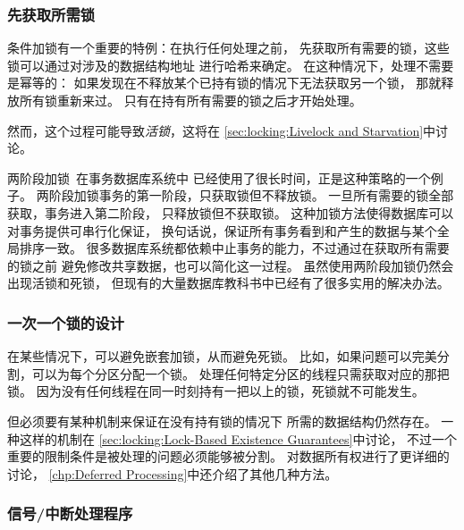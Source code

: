 \subsubsection{先获取所需锁}
\label{sec:locking:Acquire Needed Locks First}

条件加锁有一个重要的特例：在执行任何处理之前，
先获取所有需要的锁，这些锁可以通过对涉及的数据结构地址
进行哈希来确定。
在这种情况下，处理不需要是幂等的：
如果发现在不释放某个已持有锁的情况下无法获取另一个锁，
那就释放所有锁重新来过。
只有在持有所有需要的锁之后才开始处理。

然而，这个过程可能导致\emph{活锁}，这将在
\cref{sec:locking:Livelock and Starvation}中讨论。

\QuickQuizEnd

两阶段加锁~\cite{PhilipABernstein1987}在事务数据库系统中
已经使用了很长时间，正是这种策略的一个例子。
两阶段加锁事务的第一阶段，只获取锁但不释放锁。
一旦所有需要的锁全部获取，事务进入第二阶段，
只释放锁但不获取锁。
这种加锁方法使得数据库可以对事务提供可串行化保证，
换句话说，保证所有事务看到和产生的数据与某个全局排序一致。
很多数据库系统都依赖中止事务的能力，不过通过在获取所有需要的锁之前
避免修改共享数据，也可以简化这一过程。
虽然使用两阶段加锁仍然会出现活锁和死锁，
但现有的大量数据库教科书中已经有了很多实用的解决办法。

\subsubsection{一次一个锁的设计}
\label{sec:locking:Single-Lock-at-a-Time Designs}

在某些情况下，可以避免嵌套加锁，从而避免死锁。
比如，如果问题可以完美分割，可以为每个分区分配一个锁。
处理任何特定分区的线程只需获取对应的那把锁。
因为没有任何线程在同一时刻持有一把以上的锁，死锁就不可能发生。

但必须要有某种机制来保证在没有持有锁的情况下
所需的数据结构仍然存在。
一种这样的机制在
\cref{sec:locking:Lock-Based Existence Guarantees}中讨论，
不过一个重要的限制条件是被处理的问题必须能够被分割。
对数据所有权进行了更详细的讨论，
\cref{chp:Deferred Processing}中还介绍了其他几种方法。

\subsubsection{信号/中断处理程序}
\label{sec:locking:Signal/Interrupt Handlers}


